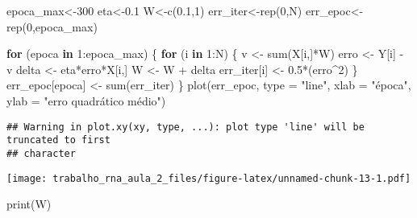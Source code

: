 \documentclass[
]{article}
\newenvironment{Shaded}{\begin{snugshade}}{\end{snugshade}}
\newcommand{\AttributeTok}[1]{\textcolor[rgb]{0.77,0.63,0.00}{#1}}
\newcommand{\ControlFlowTok}[1]{\textcolor[rgb]{0.13,0.29,0.53}{\textbf{#1}}}
\newcommand{\DecValTok}[1]{\textcolor[rgb]{0.00,0.00,0.81}{#1}}
\newcommand{\FloatTok}[1]{\textcolor[rgb]{0.00,0.00,0.81}{#1}}
\newcommand{\FunctionTok}[1]{\textcolor[rgb]{0.00,0.00,0.00}{#1}}
\newcommand{\NormalTok}[1]{#1}
\newcommand{\OtherTok}[1]{\textcolor[rgb]{0.56,0.35,0.01}{#1}}
\newcommand{\SpecialCharTok}[1]{\textcolor[rgb]{0.00,0.00,0.00}{#1}}
\newcommand{\StringTok}[1]{\textcolor[rgb]{0.31,0.60,0.02}{#1}}
\begin{document}
\begin{Shaded}
\begin{Highlighting}[]
\NormalTok{epoca\_max}\OtherTok{\textless{}{-}}\DecValTok{300}
\NormalTok{eta}\OtherTok{\textless{}{-}}\FloatTok{0.1}
\NormalTok{W}\OtherTok{\textless{}{-}}\FunctionTok{c}\NormalTok{(}\FloatTok{0.1}\NormalTok{,}\DecValTok{1}\NormalTok{)}
\NormalTok{err\_iter}\OtherTok{\textless{}{-}}\FunctionTok{rep}\NormalTok{(}\DecValTok{0}\NormalTok{,N)}
\NormalTok{err\_epoc}\OtherTok{\textless{}{-}}\FunctionTok{rep}\NormalTok{(}\DecValTok{0}\NormalTok{,epoca\_max)}

\ControlFlowTok{for}\NormalTok{ (epoca }\ControlFlowTok{in} \DecValTok{1}\SpecialCharTok{:}\NormalTok{epoca\_max) \{}
  \ControlFlowTok{for}\NormalTok{ (i }\ControlFlowTok{in} \DecValTok{1}\SpecialCharTok{:}\NormalTok{N) \{}
\NormalTok{    v }\OtherTok{\textless{}{-}} \FunctionTok{sum}\NormalTok{(X[i,]}\SpecialCharTok{*}\NormalTok{W)}
\NormalTok{    erro }\OtherTok{\textless{}{-}}\NormalTok{ Y[i] }\SpecialCharTok{{-}}\NormalTok{ v}
\NormalTok{    delta }\OtherTok{\textless{}{-}}\NormalTok{ eta}\SpecialCharTok{*}\NormalTok{erro}\SpecialCharTok{*}\NormalTok{X[i,]}
\NormalTok{    W }\OtherTok{\textless{}{-}}\NormalTok{ W }\SpecialCharTok{+}\NormalTok{ delta}
\NormalTok{    err\_iter[i] }\OtherTok{\textless{}{-}} \FloatTok{0.5}\SpecialCharTok{*}\NormalTok{(erro}\SpecialCharTok{\^{}}\DecValTok{2}\NormalTok{)}
\NormalTok{  \}}
\NormalTok{  err\_epoc[epoca] }\OtherTok{\textless{}{-}} \FunctionTok{sum}\NormalTok{(err\_iter)}
\NormalTok{\}}
\FunctionTok{plot}\NormalTok{(err\_epoc, }\AttributeTok{type =} \StringTok{"line"}\NormalTok{, }\AttributeTok{xlab =} \StringTok{"época"}\NormalTok{, }\AttributeTok{ylab =} \StringTok{"erro quadrático médio"}\NormalTok{)}
\end{Highlighting}
\end{Shaded}

\begin{verbatim}
## Warning in plot.xy(xy, type, ...): plot type 'line' will be truncated to first
## character
\end{verbatim}

\texttt{[image: trabalho\_rna\_aula\_2\_files/figure-latex/unnamed-chunk-13-1.pdf]}

\begin{Shaded}
\begin{Highlighting}[]
\FunctionTok{print}\NormalTok{(W)}
\end{Highlighting}
\end{Shaded}
\end{document}
